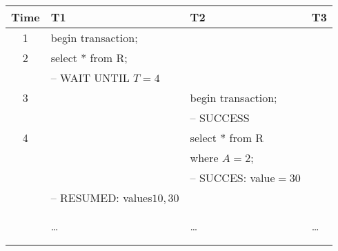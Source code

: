 \documentclass[addpoints,answers,12pt]{exam}
\begin{document}
\begin{questions}
\begin{parts}
\begin{subparts}
\begin{center} 
{\footnotesize
\begin{tabular}{|c|l|l|l|} \hline
  Time & T1 & T2 & T3 \\ \hline
1 & begin transaction;              &                    & \\ \hline
2 & select * from R;                &                    & \\
  & -- WAIT UNTIL $T=4$             &                    & \\ \hline
3 &                                 & begin transaction; & \\
  &                                 & -- SUCCESS         & \\ \hline
4 &                                 & select * from R    & \\
  &                                 & where $A=2$;       & \\ 
  &                                 & -- SUCCES: value$=30$   & \\
  & -- RESUMED: values$10,30$       &                    & \\ \hline
  &                                 &                    & \\
  &                                 &                    & \\
  & \ldots                          & \ldots             & \ldots \\
  &                                 &                    & \\
  &                                 &                    & \\  \hline
\end{tabular}
}
\end{center}


\newpage


\end{subparts}
\end{parts}
\end{questions}
\end{document}

